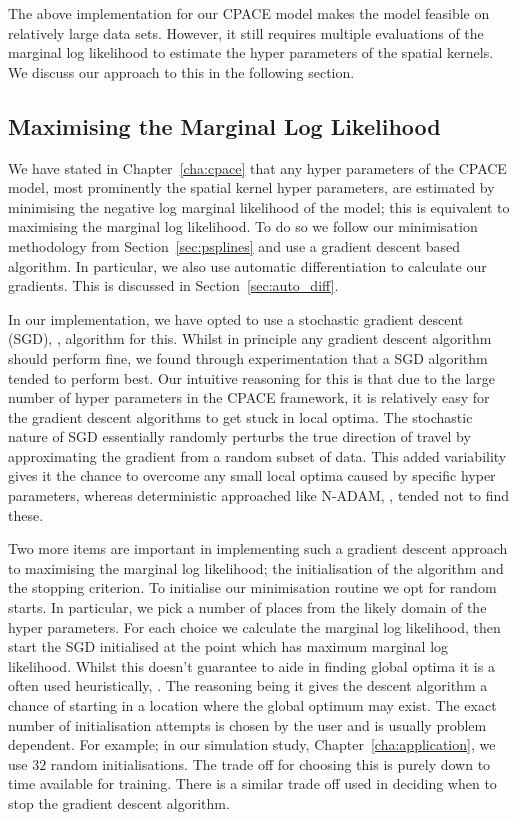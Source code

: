 The above implementation for our CPACE model makes the model feasible on relatively large data sets.
However, it still requires multiple evaluations of the marginal log likelihood to estimate the hyper parameters of the spatial kernels.
We discuss our approach to this in the following section.

\subsection{Maximising the Marginal Log Likelihood \label{ssec:imp_gp_min}}
We have stated in Chapter~\ref{cha:cpace} that any hyper parameters of the CPACE model, most prominently the spatial kernel hyper parameters, are estimated by minimising the negative log marginal likelihood of the model; this is equivalent to maximising the marginal log likelihood.
To do so we follow our minimisation methodology from Section~\ref{sec:psplines} and use a gradient descent based algorithm.
In particular, we also use automatic differentiation to calculate our gradients.
This is discussed in Section~\ref{sec:auto_diff}.

In our implementation, we have opted to use a stochastic gradient descent (SGD), \citep{sra_optimization_2012}, algorithm for this.
Whilst in principle any gradient descent algorithm should perform fine, we found through experimentation that a SGD algorithm tended to perform best.
Our intuitive reasoning for this is that due to the large number of hyper parameters in the CPACE framework, it is relatively easy for the gradient descent algorithms to get stuck in local optima.
The stochastic nature of SGD essentially randomly perturbs the true direction of travel by approximating the gradient from a random subset of data. 
This added variability gives it the chance to overcome any small local optima caused by specific hyper parameters, whereas deterministic approached like N-ADAM, \citep{dozat_incorporating_2016}, tended not to find these.

Two more items are important in implementing such a gradient descent approach to maximising the marginal log likelihood; the initialisation of the algorithm and the stopping criterion.
To initialise our minimisation routine we opt for random starts.
In particular, we pick a number of places from the likely domain of the hyper parameters.
For each choice we calculate the marginal log likelihood, then start the SGD initialised at the point which has maximum marginal log likelihood.
Whilst this doesn't guarantee to aide in finding global optima it is a often used heuristically, \citep{sra_optimization_2012}.
The reasoning being it gives the descent algorithm a chance of starting in a location where the global optimum may exist.
The exact number of initialisation attempts is chosen by the user and is usually problem dependent. 
For example; in our simulation study, Chapter~\ref{cha:application},  we use $32$ random initialisations.
The trade off for choosing this is purely down to time available for training.
There is a similar trade off used in deciding when to stop the gradient descent algorithm.

